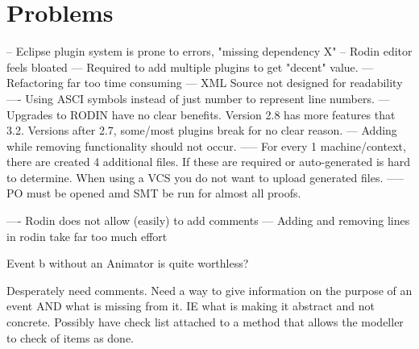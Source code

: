 \section{Problems}
-- Eclipse plugin system is prone to errors, "missing dependency X"
-- Rodin editor feels bloated
--- Required to add multiple plugins to get "decent" value.
--- Refactoring far too time consuming
--- XML Source not designed for readability
---- Using ASCI symbols instead of just number to represent line numbers.
--- Upgrades to RODIN have no clear benefits. Version 2.8 has more features that 3.2. Versions after 2.7, some/most plugins break for no clear reason.
--- Adding while removing functionality should not occur. 
----- For every 1 machine/context, there are created 4 additional files. If these are required or auto-generated is hard to determine. When using a VCS you do not want to upload generated files.  
----- PO must be opened amd SMT be run for almost all proofs.

---- Rodin does not allow (easily) to add comments
--- Adding and removing lines in rodin take far too much effort

Event b without an Animator is quite worthless? 


Desperately need comments. Need a way to give information on the purpose of an event AND what is missing from it. IE what is making it abstract and not concrete. Possibly have check list attached to a method that allows the modeller to check of items as done. 